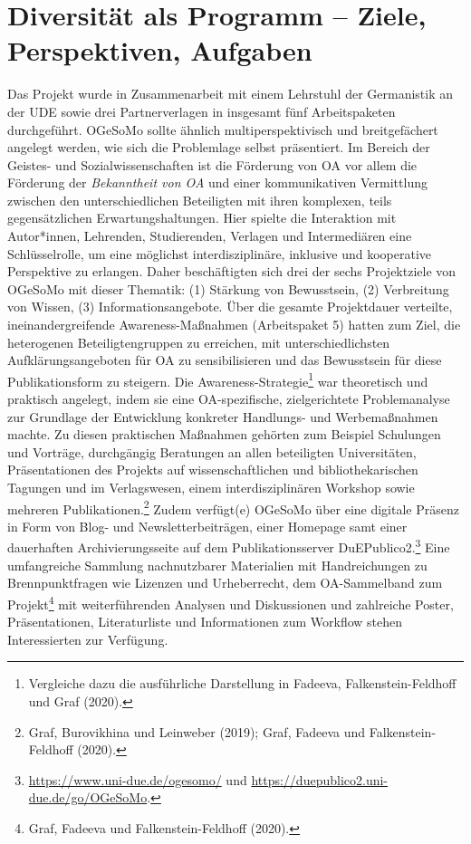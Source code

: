 \documentclass[a4paper,
fontsize=11pt,
oneside,
numbers=noperiodatend,
parskip=half-,
bibliography=totoc,
final
]{scrartcl}
\begin{document}
\hypertarget{diversituxe4t-als-programm-ziele-perspektiven-aufgaben}{%
\section{Diversität als Programm -- Ziele, Perspektiven,
Aufgaben}\label{diversituxe4t-als-programm-ziele-perspektiven-aufgaben}}

Das Projekt wurde in Zusammenarbeit mit einem Lehrstuhl der Germanistik
an der UDE sowie drei Partnerverlagen in insgesamt fünf Arbeitspaketen
durchgeführt. OGeSoMo sollte ähnlich multiperspektivisch und
breitgefächert angelegt werden, wie sich die Problemlage selbst
präsentiert. Im Bereich der Geistes- und Sozialwissenschaften ist die
Förderung von OA vor allem die Förderung der \emph{Bekanntheit von OA}
und einer kommunikativen Vermittlung zwischen den unterschiedlichen
Beteiligten mit ihren komplexen, teils gegensätzlichen
Erwartungshaltungen. Hier spielte die Interaktion mit Autor*innen,
Lehrenden, Studierenden, Verlagen und Intermediären eine Schlüsselrolle,
um eine möglichst interdisziplinäre, inklusive und kooperative
Perspektive zu erlangen. Daher beschäftigten sich drei der sechs
Projektziele von OGeSoMo mit dieser Thematik: (1) Stärkung von
Bewusstsein, (2) Verbreitung von Wissen, (3) Informationsangebote. Über
die gesamte Projektdauer verteilte, ineinandergreifende
Awareness-Maßnahmen (Arbeitspaket 5) hatten zum Ziel, die heterogenen
Beteiligtengruppen zu erreichen, mit unterschiedlichsten
Aufklärungsangeboten für OA zu sensibilisieren und das Bewusstsein für
diese Publikationsform zu steigern. Die Awareness-Strategie\footnote{Vergleiche
  dazu die ausführliche Darstellung in Fadeeva, Falkenstein-Feldhoff und
  Graf (2020).} war theoretisch und praktisch angelegt, indem sie eine
OA-spezifische, zielgerichtete Problemanalyse zur Grundlage der
Entwicklung konkreter Handlungs- und Werbemaßnahmen machte. Zu diesen
praktischen Maßnahmen gehörten zum Beispiel Schulungen und Vorträge,
durchgängig Beratungen an allen beteiligten Universitäten,
Präsentationen des Projekts auf wissenschaftlichen und
bibliothekarischen Tagungen und im Verlagswesen, einem
interdisziplinären Workshop sowie mehreren Publikationen.\footnote{Graf,
  Burovikhina und Leinweber (2019); Graf, Fadeeva und
  Falkenstein-Feldhoff (2020).} Zudem verfügt(e) OGeSoMo über eine
digitale Präsenz in Form von Blog- und Newsletterbeiträgen, einer
Homepage samt einer dauerhaften Archivierungsseite auf dem
Publikationsserver DuEPublico2.\footnote{\url{https://www.uni-due.de/ogesomo/}
  und \url{https://duepublico2.uni-due.de/go/OGeSoMo}.} Eine
umfangreiche Sammlung nachnutzbarer Materialien mit Handreichungen zu
Brennpunktfragen wie Lizenzen und Urheberrecht, dem OA-Sammelband zum
Projekt\footnote{Graf, Fadeeva und Falkenstein-Feldhoff (2020).} mit
weiterführenden Analysen und Diskussionen und zahlreiche Poster,
Präsentationen, Literaturliste und Informationen zum Workflow stehen
Interessierten zur Verfügung.
\end{document}
